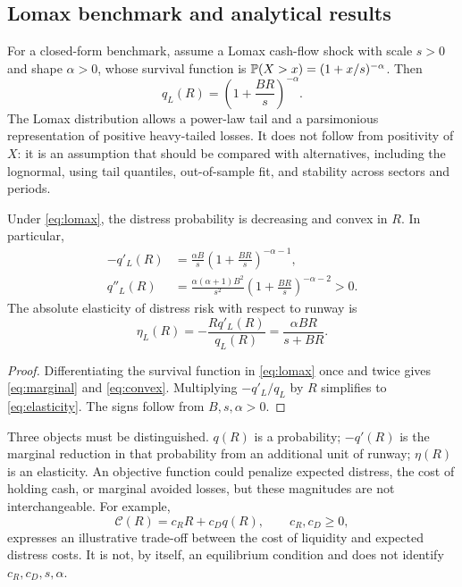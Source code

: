 \documentclass[11pt,a4paper]{article}
\begin{document}
\subsection{Lomax benchmark and analytical results}
For a closed-form benchmark, assume a Lomax cash-flow shock with scale $s>0$ and shape $\alpha>0$, whose survival function is $\mathbb P(X>x)=(1+x/s)^{-\alpha}$. Then
\begin{equation}
q_L(R)=\left(1+\frac{BR}{s}\right)^{-\alpha}. \label{eq:lomax}
\end{equation}
The Lomax distribution allows a power-law tail and a parsimonious representation of positive heavy-tailed losses. It does not follow from positivity of $X$: it is an assumption that should be compared with alternatives, including the lognormal, using tail quantiles, out-of-sample fit, and stability across sectors and periods.

\begin{proposition}
Under \eqref{eq:lomax}, the distress probability is decreasing and convex in $R$. In particular,
\begin{align}
-q'_L(R)&=\frac{\alpha B}{s}\left(1+\frac{BR}{s}\right)^{-\alpha-1}, \label{eq:marginal}\\
q''_L(R)&=\frac{\alpha(\alpha+1)B^2}{s^2}\left(1+\frac{BR}{s}\right)^{-\alpha-2}>0. \label{eq:convex}
\end{align}
The absolute elasticity of distress risk with respect to runway is
\begin{equation}
\eta_L(R)=-\frac{R q'_L(R)}{q_L(R)}=\frac{\alpha BR}{s+BR}. \label{eq:elasticity}
\end{equation}
\end{proposition}
\begin{proof}
Differentiating the survival function in \eqref{eq:lomax} once and twice gives \eqref{eq:marginal} and \eqref{eq:convex}. Multiplying $-q'_L/q_L$ by $R$ simplifies to \eqref{eq:elasticity}. The signs follow from $B,s,\alpha>0$.\end{proof}

Three objects must be distinguished. $q(R)$ is a probability; $-q'(R)$ is the marginal reduction in that probability from an additional unit of runway; $\eta(R)$ is an elasticity. An objective function could penalize expected distress, the cost of holding cash, or marginal avoided losses, but these magnitudes are not interchangeable. For example,
\begin{equation}
\mathcal C(R)=c_RR+c_Dq(R),\qquad c_R,c_D\geq0, \label{eq:cost}
\end{equation}
expresses an illustrative trade-off between the cost of liquidity and expected distress costs. It is not, by itself, an equilibrium condition and does not identify $c_R,c_D,s,\alpha$.
\end{document}
